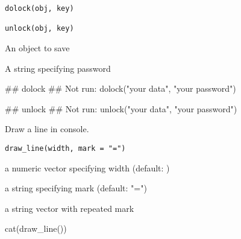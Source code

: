 \documentclass[letterpaper]{book}
\begin{document}
%
\begin{Usage}
\begin{verbatim}
dolock(obj, key)

unlock(obj, key)
\end{verbatim}
\end{Usage}
%
\begin{Arguments}
\begin{ldescription}
\item[\code{obj}] An object to save

\item[\code{key}] A string specifying password
\end{ldescription}
\end{Arguments}
%
\begin{Examples}
\begin{ExampleCode}
## dolock
## Not run: dolock("your data", "your password")

## unlock
## Not run: unlock("your data", "your password")

\end{ExampleCode}
\end{Examples}
%
\begin{Description}
Draw a line in console.
\end{Description}
%
\begin{Usage}
\begin{verbatim}
draw_line(width, mark = "=")
\end{verbatim}
\end{Usage}
%
\begin{Arguments}
\begin{ldescription}
\item[\code{width}] a numeric vector specifying width (default: )

\item[\code{mark}] a string specifying mark (default: "=")
\end{ldescription}
\end{Arguments}
%
\begin{Value}
a string vector with repeated mark
\end{Value}
%
\begin{Examples}
\begin{ExampleCode}
cat(draw_line())

\end{ExampleCode}
\end{Examples}
\end{document}
